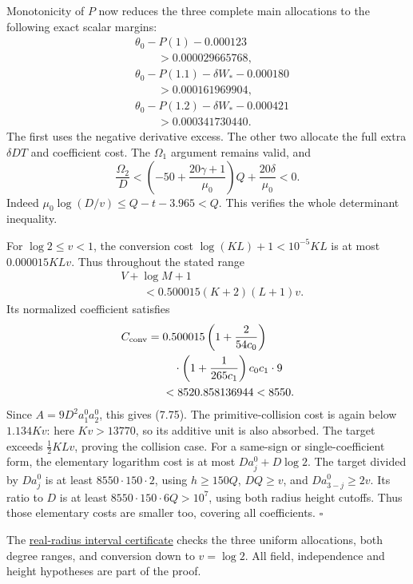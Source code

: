 \documentclass[
  11pt,
  a4paper,
]{article}
\begin{document}
Monotonicity of \(P\) now reduces the three complete main allocations to
the following exact scalar margins: \[
\begin{aligned}
&\theta_0-P(1)-0.000123\\
&\qquad>0.000029665768,\\
&\theta_0-P(1.1)-\delta W_*-0.000180\\
&\qquad>0.000161969904,\\
&\theta_0-P(1.2)-\delta W_*-0.000421\\
&\qquad>0.000341730440.
\end{aligned}
\] The first uses the negative derivative excess. The other two allocate
the full extra \(\delta DT\) and coefficient cost. The \(\Omega_1\)
argument remains valid, and \[
\frac{\Omega_2}{D}
<\left(-50+\frac{20\gamma+1}{\mu_0}\right)Q
+\frac{20\delta}{\mu_0}<0.
\] Indeed \(\mu_0\log(D/v)\le Q-t-3.965<Q\). This verifies the whole
determinant inequality.

For \(\log2\le v<1\), the conversion cost \(\log(KL)+1<10^{-5}KL\) is at
most \(0.000015KLv\). Thus throughout the stated range \[
\begin{aligned}
&V+\log M+1\\
&\qquad<0.500015(K+2)(L+1)v.
\end{aligned}
\] Its normalized coefficient satisfies \[
\begin{aligned}
C_{\rm conv}={}&0.500015\left(1+\frac2{54c_0}\right)\\
&\quad\cdot\left(1+\frac1{265c_1}\right)c_0c_1\cdot9\\
&<8520.858136944<8550.
\end{aligned}
\] Since \(A=9D^2a_1^0a_2^0\), this gives (7.75). The
primitive-collision cost is again below \(1.134Kv\): here \(Kv>13770\),
so its additive unit is also absorbed. The target exceeds
\(\tfrac12KLv\), proving the collision case. For a same-sign or
single-coefficient form, the elementary logarithm cost is at most
\(Da_j^0+D\log2\). The target divided by \(Da_j^0\) is at least
\(8550\cdot150\cdot2\), using \(h\ge150Q\), \(DQ\ge v\), and
\(Da_{3-j}^0\ge2v\). Its ratio to \(D\) is at least
\(8550\cdot150\cdot6Q>10^7\), using both radius height cutoffs. Thus
those elementary costs are smaller too, covering all coefficients.
\(\square\)

The \href{https://kokunoyumeto.github.io/open-math-courses-public/courses/TR-BAKER/verification/gouillon_real_radius.py}{real-radius interval
certificate} checks the three uniform allocations, both degree ranges,
and conversion down to \(v=\log2\). All field, independence and height
hypotheses are part of the proof.
\end{document}
